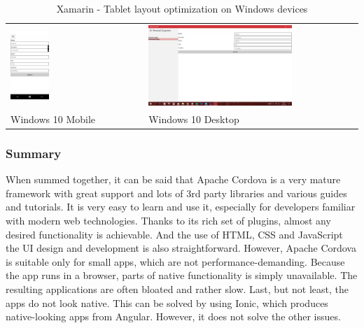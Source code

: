 \documentclass[english,master,public,dept460,male,cpdeclaration,oneside]{diploma}
\begin{document}
\begin{table}[!h]
	\centering
	\caption{Xamarin - Tablet layout optimization on Windows devices}
	\label{table:uis}
	\begin{tabular}{p{5cm} | p{11cm}  }
		\toprule		
		\includegraphics[width=0.3\textwidth]{Figures/xamarin6windows.PNG}
		& \includegraphics[width=0.7\textwidth]{Figures/xamarin6winx.PNG}
		\\
		Windows 10 Mobile & Windows 10 Desktop \\
		\midrule
	\end{tabular}
\end{table}

\subsubsection{Summary}
When summed together, it can be said that Apache Cordova is a very mature framework with great support and lots of 3rd party libraries and various guides and tutorials. It is very easy to learn and use it, especially for developers familiar with modern web technologies. Thanks to its rich set of plugins, almost any desired functionality is achievable. And the use of HTML, CSS and JavaScript the UI design and development is also straightforward. However, Apache Cordova is suitable only for small apps, which are not performance-demanding. Because the app runs in a browser, parts of native functionality is simply unavailable. The resulting applications are often bloated and rather slow. Last, but not least, the apps do not look native. This can be solved by using Ionic, which produces native-looking apps from Angular. However, it does not solve the other issues. 
\end{document}
